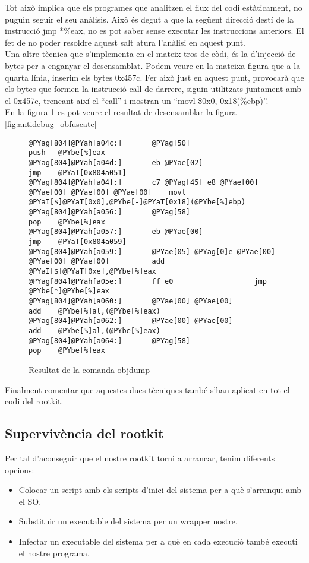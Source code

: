 Tot això implica que els programes que analitzen
el flux del codi estàticament, no puguin seguir el seu anàlisis. Això és degut a que la següent direcció destí
de la instrucció jmp *\%eax, no es pot saber sense executar les instruccions anteriors. El fet de no poder resoldre aquest
salt atura l'anàlisi en aquest punt. \\

Una altre tècnica que s'implementa en el mateix tros de còdi, és la d'injecció de bytes per a enganyar el
desensamblat. Podem veure en la mateixa figura que a la quarta línia, inserim els bytes 0x457c. Fer això
just en aquest punt, provocarà que els bytes que formen la instrucció call de darrere, siguin utilitzats
juntament amb el 0x457c, trencant així el ``call'' i mostran un ``movl \$0x0,-0x18(\%ebp)''. \\

En la figura \ref{fig:antidebug_obfuscate2} es pot veure el resultat de desensamblar la figura \ref{fig:antidebug_obfuscate}

\begin{figure}[htp]
\begin{Verbatim}[commandchars=@\[\]]
@PYag[804]@PYah[a04c:]       @PYag[50]                      push   @PYbe[%]eax
@PYag[804]@PYah[a04d:]       eb @PYae[02]                   jmp    @PYaT[0x804a051]
@PYag[804]@PYah[a04f:]       c7 @PYag[45] e8 @PYae[00] @PYae[00] @PYae[00] @PYae[00]    movl   @PYaI[$]@PYaT[0x0],@PYbe[-]@PYaT[0x18](@PYbe[%]ebp)
@PYag[804]@PYah[a056:]       @PYag[58]                      pop    @PYbe[%]eax
@PYag[804]@PYah[a057:]       eb @PYae[00]                   jmp    @PYaT[0x804a059]
@PYag[804]@PYah[a059:]       @PYae[05] @PYag[0]e @PYae[00] @PYae[00] @PYae[00]          add    @PYaI[$]@PYaT[0xe],@PYbe[%]eax
@PYag[804]@PYah[a05e:]       ff e0                   jmp    @PYbe[*]@PYbe[%]eax
@PYag[804]@PYah[a060:]       @PYae[00] @PYae[00]                   add    @PYbe[%]al,(@PYbe[%]eax)
@PYag[804]@PYah[a062:]       @PYae[00] @PYae[00]                   add    @PYbe[%]al,(@PYbe[%]eax)
@PYag[804]@PYah[a064:]       @PYag[58]                      pop    @PYbe[%]eax
\end{Verbatim}
	\caption{Resultat de la comanda objdump}
	\label{fig:antidebug_obfuscate2}
\end{figure}

Finalment comentar que aquestes dues tècniques també s'han aplicat en tot el codi del rootkit.

\subsection{Supervivència del rootkit}
Per tal d'aconseguir que el nostre rootkit torni a arrancar, tenim diferents opcions:
\begin{itemize}
\item Colocar un script amb els scripts d'inici del sistema per a què s'arranqui amb el SO.
\item Substituir un executable del sistema per un wrapper nostre.
\item Infectar un executable del sistema per a què en cada execució també executi el nostre programa.
\end{itemize}

